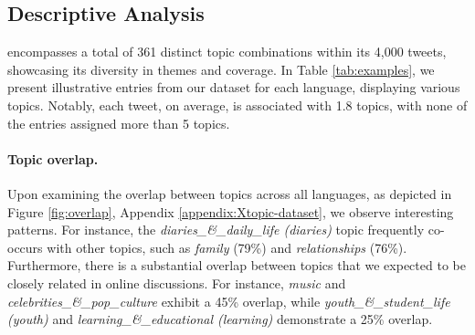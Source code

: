 \begin{table}[ht]
\centering
{}

\caption{Annotator agreement in each language subset of {\XTOPIC} and {\TweetTopic}, as well as the average number of topics (\textit{AVG Topics}) assigned to each tweet.}
\label{tab:annotators-agreement}
\end{table}




\subsection{Descriptive Analysis}

{\XTOPIC} encompasses a total of 361 distinct topic combinations within its 4,000 tweets, showcasing its diversity in themes and coverage. In Table \ref{tab:examples}, we present illustrative entries from our dataset for each language, displaying various topics. Notably, each tweet, on average, is associated with 1.8 topics, with none of the entries assigned more than 5 topics.


\paragraph{Topic overlap.} Upon examining the overlap between topics across all languages, as depicted in Figure \ref{fig:overlap}, Appendix \ref{appendix:Xtopic-dataset}, we observe interesting patterns. For instance, the \textit{diaries\_\&\_daily\_life (diaries)}  topic frequently co-occurs with other topics, such as \textit{family} (79\%) and \textit{relationships} (76\%). Furthermore, there is a substantial overlap between topics %
that we expected to be closely related in online discussions.
For instance, \textit{music} and \textit{celebrities\_\&\_pop\_culture} exhibit a 45\% overlap, while \textit{youth\_\&\_student\_life (youth)} and \textit{learning\_\&\_educational (learning)} demonstrate a 25\% overlap.

